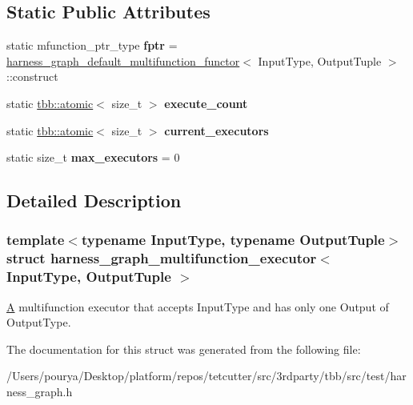 \subsection*{Static Public Attributes}
\begin{DoxyCompactItemize}
\item 
\hypertarget{structharness__graph__multifunction__executor_af2d49f6708c2d727007c8d00760841ca}{}static mfunction\+\_\+ptr\+\_\+type {\bfseries fptr} = \hyperlink{structharness__graph__default__multifunction__functor}{harness\+\_\+graph\+\_\+default\+\_\+multifunction\+\_\+functor}$<$ Input\+Type, Output\+Tuple $>$\+::construct\label{structharness__graph__multifunction__executor_af2d49f6708c2d727007c8d00760841ca}

\item 
\hypertarget{structharness__graph__multifunction__executor_af69f5f69d66b3cd3f1a480692d1e2738}{}static \hyperlink{structtbb_1_1atomic}{tbb\+::atomic}$<$ size\+\_\+t $>$ {\bfseries execute\+\_\+count}\label{structharness__graph__multifunction__executor_af69f5f69d66b3cd3f1a480692d1e2738}

\item 
\hypertarget{structharness__graph__multifunction__executor_add22a2004a9a811636e462b5264cb821}{}static \hyperlink{structtbb_1_1atomic}{tbb\+::atomic}$<$ size\+\_\+t $>$ {\bfseries current\+\_\+executors}\label{structharness__graph__multifunction__executor_add22a2004a9a811636e462b5264cb821}

\item 
\hypertarget{structharness__graph__multifunction__executor_a23040aed77c5344015af3e7432b68fed}{}static size\+\_\+t {\bfseries max\+\_\+executors} = 0\label{structharness__graph__multifunction__executor_a23040aed77c5344015af3e7432b68fed}

\end{DoxyCompactItemize}


\subsection{Detailed Description}
\subsubsection*{template$<$typename Input\+Type, typename Output\+Tuple$>$struct harness\+\_\+graph\+\_\+multifunction\+\_\+executor$<$ Input\+Type, Output\+Tuple $>$}

\hyperlink{structA}{A} multifunction executor that accepts Input\+Type and has only one Output of Output\+Type. 

The documentation for this struct was generated from the following file\+:\begin{DoxyCompactItemize}
\item 
/\+Users/pourya/\+Desktop/platform/repos/tetcutter/src/3rdparty/tbb/src/test/harness\+\_\+graph.\+h\end{DoxyCompactItemize}
